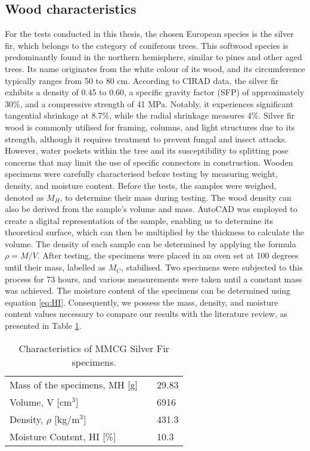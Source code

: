 \subsection{Wood characteristics}

For the tests conducted in this thesis, the chosen European species is the silver fir, which belongs to the category of coniferous trees. This softwood species is predominantly found in the northern hemisphere, similar to pines and other aged trees. Its name originates from the white colour of its wood, and its circumference typically ranges from 50 to 80 cm. According to CIRAD data, the silver fir exhibits a density of 0.45 to 0.60, a specific gravity factor (SFP) of approximately 30\%, and a compressive strength of 41 MPa. Notably, it experiences significant tangential shrinkage at 8.7\%, while the radial shrinkage measures 4\%. Silver fir wood is commonly utilised for framing, columns, and light structures due to its strength, although it requires treatment to prevent fungal and insect attacks. However, water pockets within the tree and its susceptibility to splitting pose concerns that may limit the use of specific connectors in construction.
Wooden specimens were carefully characterised before testing by measuring weight, density, and moisture content. Before the tests, the samples were weighed, denoted as $M_H$, to determine their mass during testing. The wood density can also be derived from the sample's volume and mass. AutoCAD was employed to create a digital representation of the sample, enabling us to determine its theoretical surface, which can then be multiplied by the thickness to calculate the volume. The density of each sample can be determined by applying the formula $\rho = M/V$.
After testing, the specimens were placed in an oven set at 100 degrees until their mass, labelled as $M_C$, stabilised. Two specimens were subjected to this process for 73 hours, and various measurements were taken until a constant mass was achieved. The moisture content of the specimens can be determined using equation \ref{eq:HI}. Consequently, we possess the mass, density, and moisture content values necessary to compare our results with the literature review, as presented in Table \ref{tab:Tabmean}.

\begin{table}[h]
	\centering
	\begin{tabular}{lcl}\toprule
		Mass of the specimens, MH [g] && 29.83  \\
		Volume, V [cm$^3$] && 6916  \\
		Density, $\rho$ [kg/m$^3$] && 431.3  \\
		Moisture Content, HI [\%] && 10.3 \\\bottomrule
	\end{tabular}
	\caption{Characteristics of MMCG Silver Fir specimens.}
	\label{tab:Tabmean}
\end{table}

